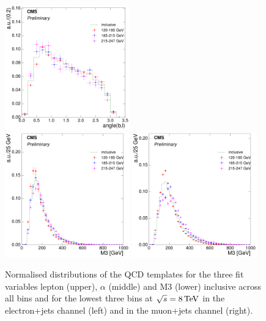 \begin{figure}[hbtp]
     \includegraphics[width=0.48\textwidth]{Chapters/04_Analysis/04b_XSections/images/8TeV/fit_variables/muon/HT/angle_bl/qcd/HT_angle_bl_1orMoreBtag_QCD_template_comparison.pdf}\\
     \includegraphics[width=0.48\textwidth]{Chapters/04_Analysis/04b_XSections/images/8TeV/fit_variables/electron/HT/M3/qcd/HT_M3_0orMoreBtag_QCD_template_comparison.pdf}\hfill
     \includegraphics[width=0.48\textwidth]{Chapters/04_Analysis/04b_XSections/images/8TeV/fit_variables/muon/HT/M3/qcd/HT_M3_0orMoreBtag_QCD_template_comparison.pdf}\\
	 \caption[Normalised distributions of the QCD templates for the three fit variables in \HT bins at
	 $\sqrt{s}=8\TeV$.]{Normalised distributions of the QCD templates for the three fit variables lepton \abseta
	 (upper), $\alpha$ (middle) and M3 (lower) inclusive across all \HT bins and for the lowest three \HT bins at
	 $\sqrt{s}=8\TeV$ in the electron+jets channel (left) and in the muon+jets channel (right).}
     \label{fig:HT_fit_variable_qcd_comparisons_8TeV}
\end{figure}

